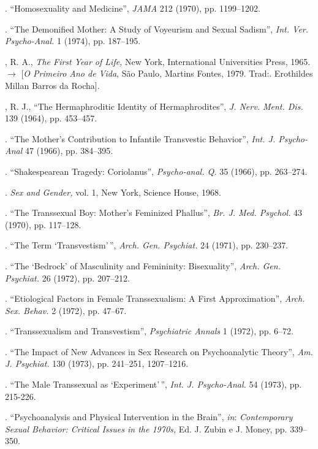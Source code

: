 \begin{description}
. ``Homosexuality and Medicine'',
\textit{JAMA }212 (1970), pp. 1199--1202.

. ``The Demonified Mother: A Study of Voyeurism
and Sexual Sadism'', \textit{Int. Ver. Psycho-Anal. }1 (1974), pp.
187--195.

, R. A., \textit{The First Year of Life, }New York, International
Universities Press, 1965. {$\bm{\rightarrow}$} [\textit{O Primeiro Ano de Vida}, São Paulo\textit{, }
Martins Fontes, 1979. Trad:. Erothildes Millan Barros da Rocha].

, R. J., ``The Hermaphroditic Identity of
Hermaphrodites'', \textit{J. Nerv. Ment. Dis. }139 (1964), pp.
453--457.

. ``The Mother's Contribution to
Infantile Transvestic Behavior'', \textit{Int. J. Psycho-Anal } 47
(1966), pp. 384--395.

. ``Shakespearean Tragedy:
Coriolanus'', \textit{Psycho-anal. Q. }35 (1966), pp. 263--274.

. \textit{Sex and Gender, }vol. 1, New York, Science House,
1968.

. ``The Transsexual Boy:
Mother's Feminized Phallus'', \textit{Br. J. Med.
Psychol. }43 (1970), pp. 117--128.

. ``The Term `Transvestism'\,'', \textit{Arch.
Gen. Psychiat. }24 (1971), pp. 230--237.

. ``The `Bedrock' of Masculinity and Femininity:
Bisexuality'', \textit{Arch. Gen. Psychiat. }26 (1972), pp. 207--212.

. ``Etiological Factors in Female Transsexualism:
A First Approximation'', \textit{Arch. Sex. Behav. }2 (1972), pp.
47--67.

. ``Transsexualism and
Transvestism'', \textit{Psychiatric Annals }1 (1972), pp. 6--72.

. ``The Impact of New Advances in Sex Research on
Psychoanalytic Theory'', \textit{Am. J. Psychiat. }130 (1973), pp.
241--251, 1207--1216.

. ``The Male Transsexual as
`Experiment'\,'', \textit{Int. J.
Psycho-Anal. }54 (1973), pp. 215-226.

. ``Psychoanalysis and Physical Intervention in
the Brain'', \textit{in}:\textit{ Contemporary Sexual Behavior:
Critical Issues in the 1970s, } Ed. J. Zubin e J. Money, pp. 339--350.


\end{description}
